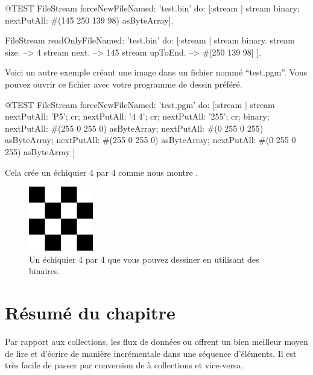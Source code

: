 \documentclass[a4paper,10pt,twoside]{book}
\begin{document}
\begin{code}{@TEST}
FileStream
  forceNewFileNamed: 'test.bin'
  do: [:stream |
          stream
            binary;
            nextPutAll: #(145 250 139 98) asByteArray].

FileStream
  readOnlyFileNamed: 'test.bin'
  do: [:stream |
          stream binary.
          stream size.         --> 4
          stream next.         --> 145
          stream upToEnd. --> #[250 139 98]
      ].
\end{code}

Voici un autre exemple créant une image dans un fichier nommé
``test.pgm''. Vous pouvez ouvrir ce fichier avec votre programme de
dessin préféré.

\begin{code}{@TEST}
FileStream
  forceNewFileNamed: 'test.pgm' 
  do: [:stream |
	stream
		nextPutAll: 'P5'; cr;
		nextPutAll: '4 4'; cr;
		nextPutAll: '255'; cr;
		binary;
		nextPutAll: #(255 0 255 0) asByteArray;
		nextPutAll: #(0 255 0 255) asByteArray;
		nextPutAll: #(255 0 255 0) asByteArray;
		nextPutAll: #(0 255 0 255) asByteArray
	]
\end{code}

Cela crée un échiquier 4 par 4 comme nous montre .

\begin{figure}[!ht]
\centerline{\includegraphics[width=0.25\textwidth]{checkerboard4x4}}
\caption{Un échiquier 4 par 4 que vous pouvez dessiner en utilisant des \streams binaires.}
\vspace{.2in}
\end{figure}

\section{Résumé du chapitre}

Par rapport aux collections, les flux de données ou \streams offrent
un bien meilleur moyen de lire et d'écrire de manière
incrémentale dans une séquence d'éléments.
Il est très facile de passer par conversion de \streams à collections et vice-versa.
\end{document}
